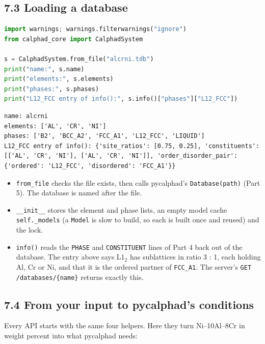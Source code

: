 \documentclass[12pt,a4paper]{article}
\begin{document}
\subsection*{7.3 Loading a database}
\begin{lstlisting}[basicstyle={\footnotesize\ttfamily},language=Python]
import warnings; warnings.filterwarnings("ignore")
from calphad_core import CalphadSystem

s = CalphadSystem.from_file("alcrni.tdb")
print("name:", s.name)
print("elements:", s.elements)
print("phases:", s.phases)
print("L12_FCC entry of info():", s.info()["phases"]["L12_FCC"])
\end{lstlisting}
\begin{lstlisting}[basicstyle={\scriptsize\ttfamily}]
name: alcrni
elements: ['AL', 'CR', 'NI']
phases: ['B2', 'BCC_A2', 'FCC_A1', 'L12_FCC', 'LIQUID']
L12_FCC entry of info(): {'site_ratios': [0.75, 0.25], 'constituents': [['AL', 'CR', 'NI'], ['AL', 'CR', 'NI']], 'order_disorder_pair': {'ordered': 'L12_FCC', 'disordered': 'FCC_A1'}}
\end{lstlisting}
\begin{itemize}
\item \texttt{from\_\allowbreak{}file} checks the file exists, then calls pycalphad's \texttt{Database(path)} (Part 5). The database is named after the file.
\item \texttt{\_\allowbreak{}\_\allowbreak{}init\_\allowbreak{}\_\allowbreak{}} stores the element and phase lists, an empty model cache \texttt{self.\allowbreak{}\_\allowbreak{}models} (a \texttt{Model} is slow to build, so each is built once and reused) and the lock.
\item \texttt{info()} reads the \texttt{PHASE} and \texttt{CONSTITUENT} lines of Part 4 back out of the database. The entry above says L1\(_{2}\) has sublattices in ratio 3 : 1, each holding Al, Cr or Ni, and that it is the ordered partner of \texttt{FCC\_\allowbreak{}A1}. The server's \texttt{GET /\allowbreak{}databases/\allowbreak{}\{name\}} returns exactly this.
\end{itemize}

\subsection*{7.4 From your input to pycalphad's conditions}
Every API starts with the same four helpers. Here they turn Ni--10Al--8Cr in weight percent into what pycalphad needs:
\end{document}
